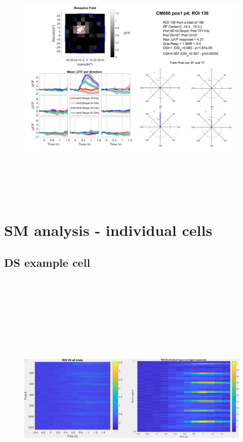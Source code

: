 \begin{figure}[H] \centering \includegraphics[width=12.5cm,height=12.5cm,keepaspectratio]{Figures/7.Results/tuning/CM006_pos1_p4_ROI0138.png} 
\label{tuninganalysisDS}
\end{figure}

\section{SM analysis - individual cells}
\subsection{DS example cell}


\begin{figure}[H] \centering \includegraphics[width=12.5cm,height=12.5cm,keepaspectratio]{Figures/7.Results/individualSM/roi 29 mf379 pos5/roi29.png} 
\end{figure}

